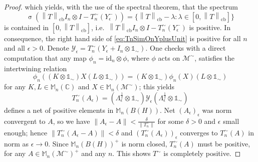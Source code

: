 \documentclass[10pt,a4paper]{amsart}
\newcommand{\cbnorm}[1]{\left\| #1 \right\|_{\mathrm{cb}}}
\newcommand{\complexes}{\mathbb{C}}
\newcommand{\id}[1]{\mathrm{id}_{#1}}
\newcommand{\matr}[1]{\mathbb{M}_{#1}(\complexes)}
\newcommand{\matra}[2]{\mathbb{M}_{#1}(#2)}
\newcommand{\spec}[1]{\operatorname{\sigma}{\left(#1\right)}}
\newcommand{\unit}{\mathds{1}}
\begin{document}
\begin{proof}
    which yields, with the use of the spectral theorem, that the spectrum
    \begin{equation}
        \spec{\cbnorm{T}I_n \otimes I - T_{n}^{\sim}(Y_{\epsilon}^{-})} = \{\cbnorm{T} - \lambda : \lambda \in [0, \cbnorm{T}] \}
    \end{equation}
    is contained in $[0,\cbnorm{T}]$, i.e.~$\cbnorm{T}I_n \otimes I - T_{n}^{\sim}(Y_{\epsilon}^{-})$ is positive. In consequence, the right hand side of \eqref{eq:TnSimOnYplusUnit} is positive for all $n$ and all $\epsilon > 0$. Denote $\mathcal{Y}_\epsilon = T_{n}^{\sim}(Y_\epsilon + I_n \otimes \unit_\sim)$. One checks with a direct computation that any map $\phi_n = \id{n}\otimes\phi$, where $\phi$ acts on $\mathscr{M}^\sim$, satisfies the intertwining relation
    \begin{equation}
        \phi_n \left((K \otimes \unit_\sim)X(L \otimes \unit_\sim)\right) = (K \otimes \unit_\sim) \phi_n(X) (L \otimes \unit_\sim)
    \end{equation}
    for any $K,L \in \matr{n}$ and $X \in \matra{n}{\mathscr{M}^\sim}$; this yields
    \begin{equation}
        T_{n}^{\sim} (A_\epsilon) = \left(\Lambda_{\epsilon}^{\frac{1}{2}}\otimes\unit_\sim\right) \mathcal{Y}_\epsilon \left(\Lambda_{\epsilon}^{\frac{1}{2}}\otimes\unit_\sim\right)
    \end{equation}
    defines a net of positive elements in $\matra{n}{B(H)}$. Net $\left(A_\epsilon\right)_\epsilon$ was norm convergent to $A$, so we have $\| A_\epsilon - A\| < \frac{\delta}{\|T^{\sim}_{n}\|}$ for some $\delta > 0$ and $\epsilon$ small enough; hence $\| T_{n}^{\sim} (A_\epsilon - A) \| < \delta$ and $\left(T_{n}^{\sim} (A_\epsilon)\right)_\epsilon$ converges to $T_{n}^{\sim}(A)$ in norm as $\epsilon \to 0$. Since $\matra{n}{B(H)}^+$ is norm closed, $T_{n}^{\sim}(A)$ must be positive, for any $A \in \matra{n}{\mathscr{M}^\sim}^+$ and any $n$. This shows $T^\sim$ is completely positive.
\end{proof}
\end{document}
